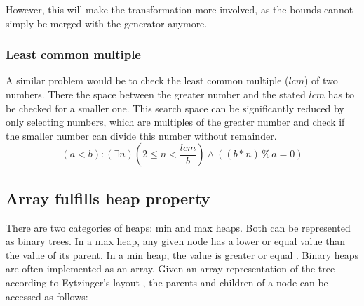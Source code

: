 \documentclass{article}
\begin{document}
However, this will make the transformation more involved, as the bounds cannot simply be merged with the generator anymore.

\subsubsection{Least common multiple}
A similar problem would be to check the least common multiple ($lcm$) of two numbers. There the space between the greater number and the stated $lcm$ has to be checked for a smaller one. This search space can be significantly reduced by only selecting numbers, which are multiples of the greater number and check if the smaller number can divide this number without remainder.
\begin{equation}\label{eq:lcm-existential}
    (a < b): (\exists n) (2 \le n < \frac{lcm}{b}) \land ((b*n) \mathbin{\%} a = 0)
\end{equation}

\subsection{Array fulfills heap property}\label{subsec:heap}
There are two categories of heaps: min and max heaps. Both can be represented as binary trees. In a max heap, any given node has a lower or equal value than the value of its parent. In a min heap, the value is greater or equal \cite{heapwiki}. Binary heaps are often implemented as an array. Given an array representation of the tree according to Eytzinger's layout \cite{tree_array}, the parents and children of a node can be accessed as follows: \cite{heapgeeks}
\end{document}
